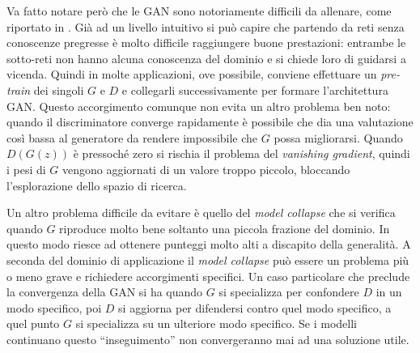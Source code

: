 Va fatto notare però che le GAN sono notoriamente difficili da allenare, come riportato in \cite{HARD_GAN}.
Già ad un livello intuitivo si può capire che partendo da reti senza conoscenze pregresse è molto difficile raggiungere buone prestazioni: entrambe le sotto-reti non hanno alcuna conoscenza del dominio e si chiede loro di guidarsi a vicenda.
Quindi in molte applicazioni, ove possibile, conviene effettuare un \emph{pre-train} dei singoli $G$ e $D$ e collegarli successivamente per formare l'architettura GAN.
Questo accorgimento comunque non evita un altro problema ben noto: quando il discriminatore converge rapidamente è possibile che dia una valutazione così bassa al generatore da rendere impossibile che $G$ possa migliorarsi.
Quando $D(G(z))$ è pressoché zero si rischia il problema del \emph{vanishing gradient}, quindi i pesi di $G$ vengono aggiornati di un valore troppo piccolo, bloccando l'esplorazione dello spazio di ricerca.

Un altro problema difficile da evitare è quello del \emph{model collapse} che si verifica quando $G$ riproduce molto bene soltanto una piccola frazione del dominio.
In questo modo riesce ad ottenere punteggi molto alti a discapito della generalità.
A seconda del dominio di applicazione il \emph{model collapse} può essere un problema più o meno grave e richiedere accorgimenti specifici.
Un caso particolare che preclude la convergenza della GAN si ha quando $G$ si specializza per confondere $D$ in un modo specifico, poi $D$ si aggiorna per difendersi contro quel modo specifico, a quel punto $G$ si specializza su un ulteriore modo specifico.
Se i modelli continuano questo ``inseguimento'' non convergeranno mai ad una soluzione utile.






